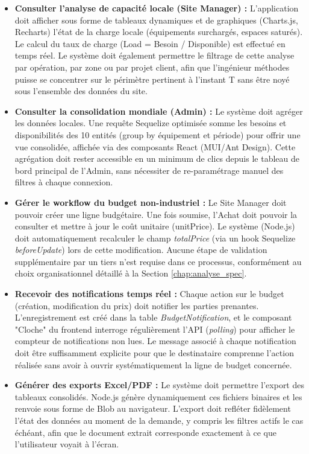 \begin{itemize}
    \item \textbf{Consulter l'analyse de capacité locale (Site Manager) :} L'application doit afficher sous forme de tableaux dynamiques et de graphiques (Charts.js, Recharts) l'état de la charge locale (équipements surchargés, espaces saturés). Le calcul du taux de charge (Load = Besoin / Disponible) est effectué en temps réel. Le système doit également permettre le filtrage de cette analyse par opération, par zone ou par projet client, afin que l'ingénieur méthodes puisse se concentrer sur le périmètre pertinent à l'instant T sans être noyé sous l'ensemble des données du site.
    
    \item \textbf{Consulter la consolidation mondiale (Admin) :} Le système doit agréger les données locales. Une requête Sequelize optimisée somme les besoins et disponibilités des 10 entités (group by équipement et période) pour offrir une vue consolidée, affichée via des composants React (MUI/Ant Design). Cette agrégation doit rester accessible en un minimum de clics depuis le tableau de bord principal de l'Admin, sans nécessiter de re-paramétrage manuel des filtres à chaque connexion.
    
    \item \textbf{Gérer le workflow du budget non-industriel :} Le Site Manager doit pouvoir créer une ligne budgétaire. Une fois soumise, l'Achat doit pouvoir la consulter et mettre à jour le coût unitaire (unitPrice). Le système (Node.js) doit automatiquement recalculer le champ \textit{totalPrice} (via un hook Sequelize \textit{beforeUpdate}) lors de cette modification. Aucune étape de validation supplémentaire par un tiers n'est requise dans ce processus, conformément au choix organisationnel détaillé à la Section \ref{chap:analyse_spec}.
    
    \item \textbf{Recevoir des notifications temps réel :} Chaque action sur le budget (création, modification du prix) doit notifier les parties prenantes. L'enregistrement est créé dans la table \textit{BudgetNotification}, et le composant "Cloche" du frontend interroge régulièrement l'API (\textit{polling}) pour afficher le compteur de notifications non lues. Le message associé à chaque notification doit être suffisamment explicite pour que le destinataire comprenne l'action réalisée sans avoir à ouvrir systématiquement la ligne de budget concernée.
    
    \item \textbf{Générer des exports Excel/PDF :} Le système doit permettre l'export des tableaux consolidés. Node.js génère dynamiquement ces fichiers binaires et les renvoie sous forme de Blob au navigateur. L'export doit refléter fidèlement l'état des données au moment de la demande, y compris les filtres actifs le cas échéant, afin que le document extrait corresponde exactement à ce que l'utilisateur voyait à l'écran.
\end{itemize}

